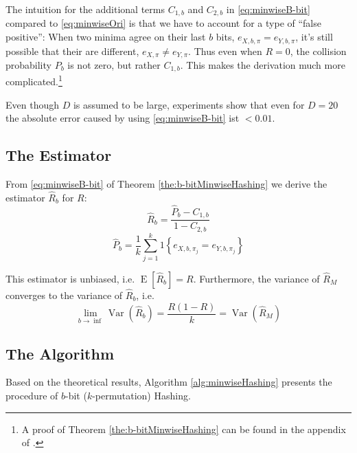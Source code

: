 \documentclass[a4paper]{article}
\DeclareMathOperator{\Var}{Var}
\DeclareMathOperator{\E}{E}
\begin{document}
The intuition for the additional terms $C_{1,b}$ and $C_{2,b}$ in \vref{eq:minwiseB-bit} compared to \vref{eq:minwiseOri} is that we have to account for a type of ``false positive'': When two minima agree on their last $b$ bits, $e_{X,b,\pi}=e_{Y,b,\pi}$, it's still possible that their are different, $e_{X,\pi}\neq e_{Y,\pi}$. Thus even when $R=0$, the collision probability $P_b$ is not zero, but rather $C_{1,b}$. This makes the derivation much more complicated.\footnote{A proof of Theorem \vref{the:b-bitMinwiseHashing} can be found in the appendix of \citep{LiK09}.}

Even though $D$ is assumed to be large, experiments show that even for $D=20$ the absolute error caused by using \vref{eq:minwiseB-bit} ist $< 0.01$.

\subsection{The Estimator}

From \vref{eq:minwiseB-bit} of Theorem \vref{the:b-bitMinwiseHashing} we derive the estimator $\hat{R}_b$ for $R$:
\begin{equation}
\hat{R}_b=\frac{\hat{P}_b-C_{1,b}}{1-C_{2,b}}
\end{equation}
\begin{equation}
\hat{P}_b = \frac{1}{k}\sum_{j=1}^k 1 \left\lbrace  e_{X,b,\pi_j } = e_{Y,b,\pi_j } \right\rbrace
\end{equation}

This estimator is unbiased, i.e. $\E[\hat{R}_b]=R$. Furthermore, the variance of $\hat{R}_M$ converges to the variance of $\hat{R}_b$, i.e.
\begin{equation}
\lim_{b\rightarrow\inf}\Var\left(\hat{R}_b\right)=\frac{R(1-R)}{k}=\Var\left(\hat{R}_M\right)
\end{equation}

\subsection{The Algorithm}

Based on the theoretical results, Algorithm \vref{alg:minwiseHashing} presents the procedure of $b$-bit ($k$-permutation) Hashing.
\end{document}
